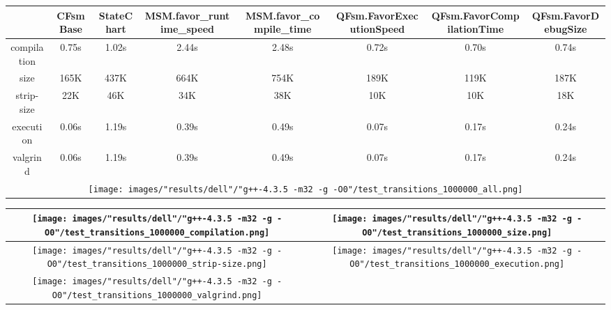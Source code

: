 \begin{landscape}
\begin{table}
\caption{"dell" [df6407d], g++-4.3.5 -m32 -g -O0/test transitions 1000000}
\centering
\begin{longtable}{| c | c |c |c |c |c |c |c |}
\hline
& CFsmBase& StateChart& MSM.favor\_runtime\_speed& MSM.favor\_compile\_time& QFsm.FavorExecutionSpeed& QFsm.FavorCompilationTime& QFsm.FavorDebugSize\\
\hline
compilation & 0.75s & 1.02s & 2.44s & 2.48s & 0.72s & 0.70s & 0.74s\\
\hline
size & 165K & 437K & 664K & 754K & 189K & 119K & 187K\\
\hline
strip-size & 22K & 46K & 34K & 38K & 10K & 10K & 18K\\
\hline
execution & 0.06s & 1.19s & 0.39s & 0.49s & 0.07s & 0.17s & 0.24s\\
\hline
valgrind & 0.06s & 1.19s & 0.39s & 0.49s & 0.07s & 0.17s & 0.24s\\
\hline
\multicolumn{8}{|c|}{\texttt{[image: images/"results/dell"/"g++-4.3.5 -m32 -g -O0"/test\_transitions\_1000000\_all.png]}}\\
\hline
\end{longtable}
\end{table}
\end{landscape}
\newpage
\begin{table}
\centering
\begin{longtable}{| c | c |}
\hline
\texttt{[image: images/"results/dell"/"g++-4.3.5 -m32 -g -O0"/test\_transitions\_1000000\_compilation.png]}& \texttt{[image: images/"results/dell"/"g++-4.3.5 -m32 -g -O0"/test\_transitions\_1000000\_size.png]}\\
\hline
\texttt{[image: images/"results/dell"/"g++-4.3.5 -m32 -g -O0"/test\_transitions\_1000000\_strip-size.png]}& \texttt{[image: images/"results/dell"/"g++-4.3.5 -m32 -g -O0"/test\_transitions\_1000000\_execution.png]}\\
\hline
\texttt{[image: images/"results/dell"/"g++-4.3.5 -m32 -g -O0"/test\_transitions\_1000000\_valgrind.png]}& \\ \hline
\end{longtable}
\end{table}
